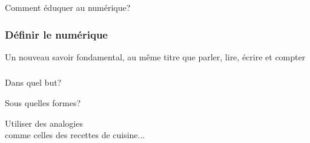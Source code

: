 \documentclass{beamer}
\begin{document}
\begin{frame}
\begin{center}
\Huge {Comment éduquer au numérique?}
\end{center}
\end{frame}

\begin{frame}
\frametitle{Définir le numérique}

\begin{block}{Un nouveau savoir fondamental, au même titre que parler, lire, écrire et compter}
\end{block}
\end{frame}
 
\begin{frame}
\frametitle{}
\begin{block}{}
\end{block}

\begin{block}{Dans quel but?}
\end{block}
\end{frame}

\begin{frame}
\begin{center}
\Huge {Sous quelles formes?}
\end{center}
\end{frame}

\begin{frame}
\begin{center}
\Huge{Utiliser des analogies \\comme celles des recettes de cuisine...}
\end{center}
\end{frame}
\end{document}
